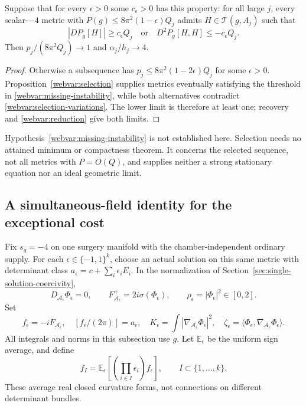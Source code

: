 \begin{proposition}
\label{webvar:instability-criterion}
Suppose that for every $\epsilon>0$ some $c_\epsilon>0$ has this
property: for all large $j$, every scalar-$-4$ metric with
$P(g)\le8\pi^2(1-\epsilon)Q_j$ admits $H\in\mathcal T(g,A_j)$ such that
\begin{equation}\label{webvar:missing-instability}
 |DP_g[H]|\ge c_\epsilon Q_j
 \quad\text{or}\quad D^2P_g[H,H]\le-c_\epsilon Q_j.
\end{equation}
Then $p_j/(8\pi^2Q_j)\to1$ and $\alpha_j/h_j\to4$.
\end{proposition}
\begin{proof}
Otherwise a subsequence has $p_j\le8\pi^2(1-2\epsilon)Q_j$ for
some $\epsilon>0$.  Proposition~\ref{webvar:selection} supplies metrics
eventually satisfying the threshold in \eqref{webvar:missing-instability},
while both alternatives contradict \eqref{webvar:selection-variations}.
The lower limit is therefore at least one; recovery and
\eqref{webvar:reduction} give both limits.
\end{proof}

Hypothesis~\eqref{webvar:missing-instability} is not established here.
Selection needs no attained minimum or compactness theorem.  It concerns
the selected sequence, not all metrics with $P=O(Q)$, and supplies
neither a strong stationary equation nor an ideal geometric limit.

\subsection{A simultaneous-field identity for the exceptional cost}

Fix $s_g=-4$ on one surgery manifold with the chamber-independent
ordinary supply.  For each $\epsilon\in\{-1,1\}^k$, choose an actual
solution on this same metric with determinant class
$a_\epsilon=c+\sum_i\epsilon_iE_i$.  In the normalization of
Section~\ref{sec:single-solution-coercivity},
\begin{equation}\label{webvar:ordinary-fields}
 D_{\mathcal A_\epsilon}\Phi_\epsilon=0,\qquad
 F_{\mathcal A_\epsilon}^+=2i\sigma(\Phi_\epsilon),\qquad
 \rho_\epsilon=|\Phi_\epsilon|^2\in[0,2].
\end{equation}
Set
\[
 f_\epsilon=-iF_{\mathcal A_\epsilon},\quad
 [f_\epsilon/(2\pi)]=a_\epsilon,\quad
 K_\epsilon=\int|\nabla_{\mathcal A_\epsilon}\Phi_\epsilon|^2,\quad
 \zeta_\epsilon=\langle\Phi_\epsilon,
                    \nabla_{\mathcal A_\epsilon}\Phi_\epsilon\rangle.
\]
All integrals and norms in this subsection use $g$.  Let
$\mathbb E_\epsilon$ be the uniform sign average, and define
\begin{equation}\label{webvar:walsh-forms}
 f_I=\mathbb E_\epsilon\left[
       \left(\prod_{i\in I}\epsilon_i\right)f_\epsilon\right],
       \qquad I\subset\{1,\ldots,k\}.
\end{equation}
These average real closed curvature forms, not connections on
different determinant bundles.

